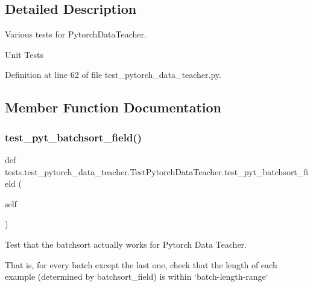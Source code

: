\subsection{Detailed Description}
\begin{DoxyVerb}Various tests for PytorchDataTeacher.
\end{DoxyVerb}
\begin{DoxyVerb}Unit Tests\end{DoxyVerb}
 

Definition at line 62 of file test\+\_\+pytorch\+\_\+data\+\_\+teacher.\+py.



\subsection{Member Function Documentation}
\mbox{\label{classtests_1_1test__pytorch__data__teacher_1_1TestPytorchDataTeacher_a1c96927436b550513d6656564ec0c5fe}} 
\subsubsection{\texorpdfstring{test\+\_\+pyt\+\_\+batchsort\+\_\+field()}{test\_pyt\_batchsort\_field()}}
{\footnotesize\ttfamily def tests.\+test\+\_\+pytorch\+\_\+data\+\_\+teacher.\+Test\+Pytorch\+Data\+Teacher.\+test\+\_\+pyt\+\_\+batchsort\+\_\+field (\begin{DoxyParamCaption}\item[{}]{self }\end{DoxyParamCaption})}

\begin{DoxyVerb}Test that the batchsort actually works for Pytorch Data Teacher.

That is, for every batch except the last one, check that the length of each
example (determined by batchsort_field) is within `batch-length-range`
\end{DoxyVerb}
 

